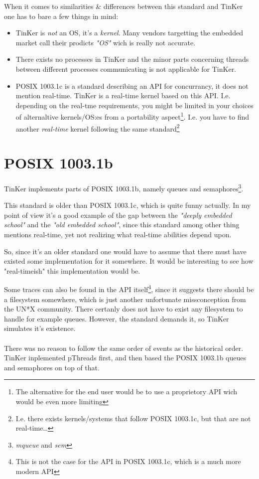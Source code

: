 When it comes to similarities \& differences between this standard and TinKer one has to bare a few things in mind:
\begin{itemize}
	\item TinKer is \textit{not} an OS, it's a \textit{kernel}. Many vendors targetting the embedded market call their prodicts \textit{"OS"} wich is really not accurate.
	\item There exists no processes in TinKer and the minor parts concerning threads between different processes communicating is not applicable for TinKer.
	\item POSIX 1003.1c is a standard describing an API for concurrancy, it does not mention real-time. TinKer is a real-time kernel based on this API. I.e. depending on the real-tme requirements, you might be limited in your choices of alternaltive kernels/OS:es from a portability aspect\footnote{The alternative for the end user would be to use a proprietory API wich would be even more limiting}. I.e. you have to find another \textit{real-time} kernel following the same standard\footnote{I.e. there exists kernels/systems that follow POSIX 1003.1c, but that are not real-time\ldots} 
\end{itemize}
\section{POSIX 1003.1b}
TinKer implements parts of POSIX 1003.1b, namely queues and semaphores\footnote{\textit{mqueue} and \textit{sem}}.

This standard is older than POSIX 1003.1c, which is quite funny actually. In my point of view it's a good example of the gap between the \textit{"deeply embedded school"} and the \textit{"old embedded school"}, since this standard among other thing mentions real-time, yet not realizing what real-time abilities depend upon.

So, since it's an older standard one would have to assume that there must have existed some implementation for it somewhere. It would be interesting to see how "real-timeish" this implementation would be.

Some traces can also be found in the API itself\footnote{This is not the case for the API in POSIX 1003.1c, which is a much more modern API}, since it suggests there should be a filesystem somewhere, which is just another unfortunate missconception from the UN*X community. There certanly does not have to exist any filesystem to handle for example queues. However, the standard demands it, so TinKer simulates it's existence.
\\\\
There was no reason to follow the same order of events as the historical order. TinKer inplemented pThreads first, and then based the POSIX 1003.1b queues and semaphores on top of that.

